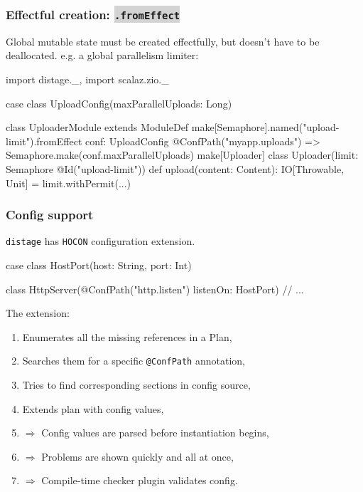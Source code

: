 \documentclass[usenames,dvipsnames]{beamer}
\newcommand{\code}[1]{\colorbox{lightgray}{\texttt{#1}}}
\newcommand{\distage}{\texttt{distage}\xspace}
\begin{document}
\begin{frame}[fragile]
\frametitle{Effectful creation: \code{.fromEffect}}
  Global mutable state must be created effectfully, but doesn't have to be deallocated. e.g. a global parallelism limiter:

  \begin{scalacode}
    import distage._, import scalaz.zio._

    case class UploadConfig(maxParallelUploads: Long)

    class UploaderModule extends ModuleDef {
      make[Semaphore].named("upload-limit").fromEffect {
        conf: UploadConfig @ConfPath("myapp.uploads") =>
          Semaphore.make(conf.maxParallelUploads) }
      make[Uploader]
    }
    class Uploader(limit: Semaphore @Id("upload-limit")) {
      def upload(content: Content): IO[Throwable, Unit] =
        limit.withPermit(...)
    }
  \end{scalacode}
\end{frame}

\begin{frame}[fragile]
\frametitle{Config support}
  \distage has \texttt{HOCON} configuration extension.

  \begin{scalacode}
case class HostPort(host: String, port: Int)

class HttpServer(@ConfPath("http.listen") listenOn: HostPort) {
  // ...
}
  \end{scalacode}

  The extension:
  \begin{enumerate}
  \item Enumerates all the missing references in a Plan,
  \item Searches them for a specific \texttt{@ConfPath} annotation,
  \item Tries to find corresponding sections in config source,
  \item Extends plan with config values,
  \item $\Rightarrow$ Config values are parsed before instantiation begins,
  \item $\Rightarrow$ Problems are shown quickly and all at once,
  \item $\Rightarrow$ Compile-time checker plugin validates config.
  \end{enumerate}
\end{frame}
\end{document}
